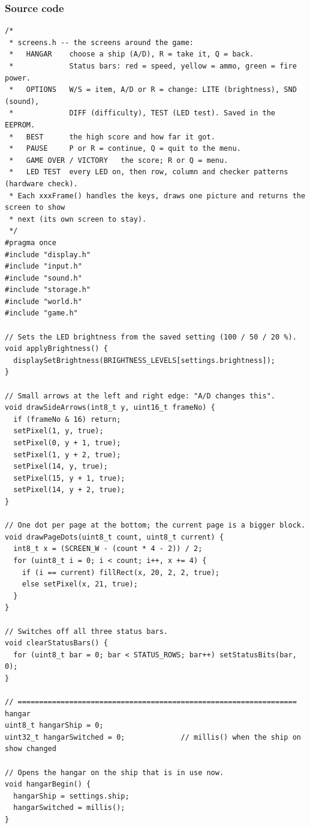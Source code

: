 \documentclass[11pt,a4paper]{article}
\begin{document}
\subsubsection*{Source code}
\begin{lstlisting}[language=Arduino]
/*
 * screens.h -- the screens around the game:
 *   HANGAR    choose a ship (A/D), R = take it, Q = back.
 *             Status bars: red = speed, yellow = ammo, green = fire power.
 *   OPTIONS   W/S = item, A/D or R = change: LITE (brightness), SND (sound),
 *             DIFF (difficulty), TEST (LED test). Saved in the EEPROM.
 *   BEST      the high score and how far it got.
 *   PAUSE     P or R = continue, Q = quit to the menu.
 *   GAME OVER / VICTORY   the score; R or Q = menu.
 *   LED TEST  every LED on, then row, column and checker patterns (hardware check).
 * Each xxxFrame() handles the keys, draws one picture and returns the screen to show
 * next (its own screen to stay).
 */
#pragma once
#include "display.h"
#include "input.h"
#include "sound.h"
#include "storage.h"
#include "world.h"
#include "game.h"

// Sets the LED brightness from the saved setting (100 / 50 / 20 %).
void applyBrightness() {
  displaySetBrightness(BRIGHTNESS_LEVELS[settings.brightness]);
}

// Small arrows at the left and right edge: "A/D changes this".
void drawSideArrows(int8_t y, uint16_t frameNo) {
  if (frameNo & 16) return;
  setPixel(1, y, true);
  setPixel(0, y + 1, true);
  setPixel(1, y + 2, true);
  setPixel(14, y, true);
  setPixel(15, y + 1, true);
  setPixel(14, y + 2, true);
}

// One dot per page at the bottom; the current page is a bigger block.
void drawPageDots(uint8_t count, uint8_t current) {
  int8_t x = (SCREEN_W - (count * 4 - 2)) / 2;
  for (uint8_t i = 0; i < count; i++, x += 4) {
    if (i == current) fillRect(x, 20, 2, 2, true);
    else setPixel(x, 21, true);
  }
}

// Switches off all three status bars.
void clearStatusBars() {
  for (uint8_t bar = 0; bar < STATUS_ROWS; bar++) setStatusBits(bar, 0);
}

// ================================================================= hangar
uint8_t hangarShip = 0;
uint32_t hangarSwitched = 0;             // millis() when the ship on show changed

// Opens the hangar on the ship that is in use now.
void hangarBegin() {
  hangarShip = settings.ship;
  hangarSwitched = millis();
}


\end{lstlisting}
\end{document}
